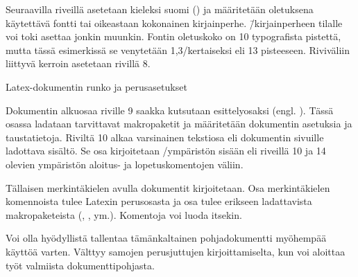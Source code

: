 Seuraavilla riveillä asetetaan kieleksi suomi () ja
määritetään oletuksena käytettävä fontti tai oikeastaan kokonainen
kirjainperhe.  \=/kirjainperheen tilalle
voi toki asettaa jonkin muunkin. Fontin oletuskoko on 10 typografista
pistettä, mutta tässä esimerkissä se venytetään 1,3\-/kertaiseksi eli 13
pisteeseen. Riviväliin liittyvä kerroin asetetaan rivillä 8.

\begin{esimerkki*}

\caption{Latex-dokumentin runko ja perus\-asetukset}
\label{esim:ensimmainen}
\end{esimerkki*}

Dokumentin alkuosaa riville 9 saakka kutsutaan esittelyosaksi (engl.
). Tässä osassa ladataan tarvittavat makropaketit ja
määritetään dokumentin asetuksia ja taustatietoja. Riviltä 10 alkaa
varsinainen tekstiosa eli dokumentin sivuille ladottava sisältö. Se osa
kirjoitetaan \-/ympäristön sisään eli riveillä 10
ja 14 olevien ympäristön aloi\-tus- ja lopetuskomentojen väliin.

Tällaisen merkintäkielen avulla dokumentit kirjoitetaan. Osa
merkintäkielen komennoista tulee Latexin perusosasta ja osa tulee
erikseen ladattavista makropaketeista (,
,  ym.). Komentoja voi luoda
itsekin.

Voi olla hyödyllistä tallentaa tämänkaltainen pohjadokumentti myöhempää
käyttöä varten. Välttyy samojen perusjuttujen kirjoittamiselta, kun voi
aloittaa työt valmiista dokumenttipohjasta.
